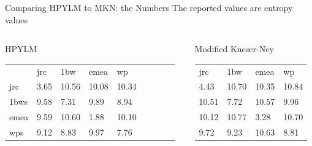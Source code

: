 \begin{frame}{Comparing HPYLM to MKN: the Numbers}
        The reported values are entropy values
        
        \begin{columns}[b]
            \begin{column}[b]{0.45\textwidth}
                \begin{block}{HPYLM}
                \begin{tabular}{lllllllll}
                         & jrc  & 1bw   & emea  & wp        \\
                    jrc  & 3.65 & 10.56 & 10.08 & 10.34     \\
                    1bws & 9.58 & 7.31  & 9.89  & 8.94      \\  
                    emea & 9.59 & 10.60 & 1.88  & 10.10     \\ 
                    wps  & 9.12 & 8.83  & 9.97  & 7.76      \\
                \end{tabular}
                \end{block}
                \vspace{0pt}
            \end{column}
            \quad
            \begin{column}[b]{0.45\textwidth}
                \begin{block}{Modified Kneser-Ney}
                \begin{tabular}{llll}
                    jrc   & 1bw   & emea  & wp    \\
                    4.43  & 10.70 & 10.35 & 10.84 \\
                    10.51 & 7.72  & 10.57 & 9.96  \\
                    10.12 & 10.77 & 3.28  & 10.70 \\
                    9.72  & 9.23  & 10.63 & 8.81  \\
                \end{tabular}
                \end{block}
                \vspace{0pt}
            \end{column}            
        \end{columns}
 

\end{frame}
